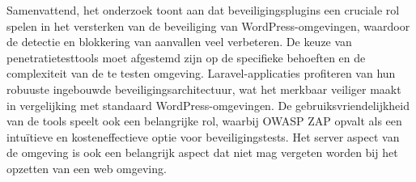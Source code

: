 Samenvattend, het onderzoek toont aan dat beveiligingsplugins een cruciale rol spelen in het versterken van de 
beveiliging van WordPress-omgevingen, waardoor de detectie en blokkering van aanvallen veel verbeteren. 
De keuze van penetratietesttools moet afgestemd zijn op de specifieke behoeften en de complexiteit van de te 
testen omgeving. Laravel-applicaties profiteren van hun robuuste ingebouwde beveiligingsarchitectuur, wat het 
merkbaar veiliger maakt in vergelijking met standaard WordPress-omgevingen. De gebruiksvriendelijkheid van de 
tools speelt ook een belangrijke rol, waarbij OWASP ZAP opvalt als een intuïtieve en kosteneffectieve optie 
voor beveiligingstests. Het server aspect van de omgeving is ook een belangrijk aspect dat niet mag vergeten worden 
bij het opzetten van een web omgeving. 